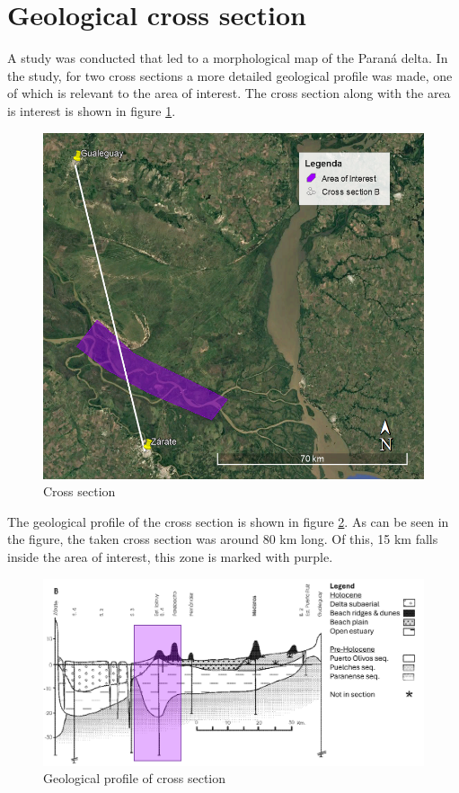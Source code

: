 \section{Geological cross section}
A study was conducted that led to a morphological map of the Paraná delta. In the study, for two cross sections a more detailed geological profile was made, one of which is relevant to the area of interest. The cross section along with the area is interest is shown in figure \ref{fig:crosssectiongeo}.

\begin{figure}[H]
    \centering
    \includegraphics[width=0.75\linewidth]{figures/ch9/CrossSectionB.png}
    \caption{Cross section}
    \label{fig:crosssectiongeo}
\end{figure}

The geological profile of the cross section is shown in figure \ref{fig:geolprofile}. As can be seen in the figure, the taken cross section was around 80 km long. Of this, 15 km falls inside the area of interest, this zone is marked with purple.

\begin{figure}[H]
    \centering
    \includegraphics[width=1\linewidth]{figures/ch9/CrossSectionBResults.png}
    \caption{Geological profile of cross section}
    \label{fig:geolprofile}
\end{figure}

